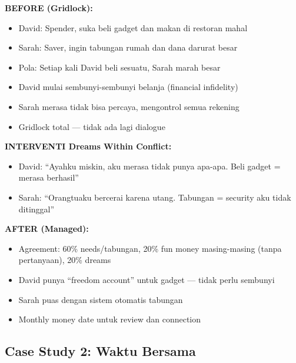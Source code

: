 \begin{praktikbox}
\textbf{BEFORE (Gridlock):}
\begin{itemize}
    \item David: Spender, suka beli gadget dan makan di restoran mahal
    \item Sarah: Saver, ingin tabungan rumah dan dana darurat besar
    \item Pola: Setiap kali David beli sesuatu, Sarah marah besar
    \item David mulai sembunyi-sembunyi belanja (financial infidelity)
    \item Sarah merasa tidak bisa percaya, mengontrol semua rekening
    \item Gridlock total --- tidak ada lagi dialogue
\end{itemize}

\textbf{INTERVENTI Dreams Within Conflict:}
\begin{itemize}
    \item David: ``Ayahku miskin, aku merasa tidak punya apa-apa. Beli gadget = merasa berhasil''
    \item Sarah: ``Orangtuaku bercerai karena utang. Tabungan = security aku tidak ditinggal''
\end{itemize}

\textbf{AFTER (Managed):}
\begin{itemize}
    \item Agreement: 60\% needs/tabungan, 20\% fun money masing-masing (tanpa pertanyaan), 20\% dreams
    \item David punya ``freedom account'' untuk gadget --- tidak perlu sembunyi
    \item Sarah puas dengan sistem otomatis tabungan
    \item Monthly money date untuk review dan connection
\end{itemize}
\end{praktikbox}

\subsection{Case Study 2: Waktu Bersama}

